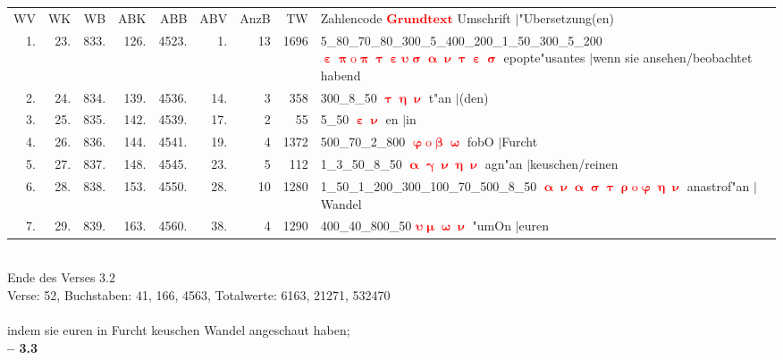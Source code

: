 \documentclass[a4paper,10pt,landscape]{article}
\begin{document}
\begin{tabular}{rrrrrrrrp{120mm}}
WV&WK&WB&ABK&ABB&ABV&AnzB&TW&Zahlencode \textcolor{red}{$\boldsymbol{Grundtext}$} Umschrift $|$"Ubersetzung(en)\\
1.&23.&833.&126.&4523.&1.&13&1696&5\_80\_70\_80\_300\_5\_400\_200\_1\_50\_300\_5\_200 \textcolor{red}{$\boldsymbol{\upepsilon\uppi\mathrm{o}\uppi\uptau\upepsilon\upsilon\upsigma\upalpha\upnu\uptau\upepsilon\upsigma}$} epopte"usantes $|$wenn sie ansehen/beobachtet habend\\
2.&24.&834.&139.&4536.&14.&3&358&300\_8\_50 \textcolor{red}{$\boldsymbol{\uptau\upeta\upnu}$} t"an $|$(den)\\
3.&25.&835.&142.&4539.&17.&2&55&5\_50 \textcolor{red}{$\boldsymbol{\upepsilon\upnu}$} en $|$in\\
4.&26.&836.&144.&4541.&19.&4&1372&500\_70\_2\_800 \textcolor{red}{$\boldsymbol{\upvarphi\mathrm{o}\upbeta\upomega}$} fobO $|$Furcht\\
5.&27.&837.&148.&4545.&23.&5&112&1\_3\_50\_8\_50 \textcolor{red}{$\boldsymbol{\upalpha\upgamma\upnu\upeta\upnu}$} agn"an $|$keuschen/reinen\\
6.&28.&838.&153.&4550.&28.&10&1280&1\_50\_1\_200\_300\_100\_70\_500\_8\_50 \textcolor{red}{$\boldsymbol{\upalpha\upnu\upalpha\upsigma\uptau\uprho\mathrm{o}\upvarphi\upeta\upnu}$} anastrof"an $|$Wandel\\
7.&29.&839.&163.&4560.&38.&4&1290&400\_40\_800\_50 \textcolor{red}{$\boldsymbol{\upsilon\upmu\upomega\upnu}$} "umOn $|$euren\\
\end{tabular}\medskip \\
Ende des Verses 3.2\\
Verse: 52, Buchstaben: 41, 166, 4563, Totalwerte: 6163, 21271, 532470\\
\\
indem sie euren in Furcht keuschen Wandel angeschaut haben;\\
\newpage 
{\bf -- 3.3}\\
\medskip \\
\end{document}
